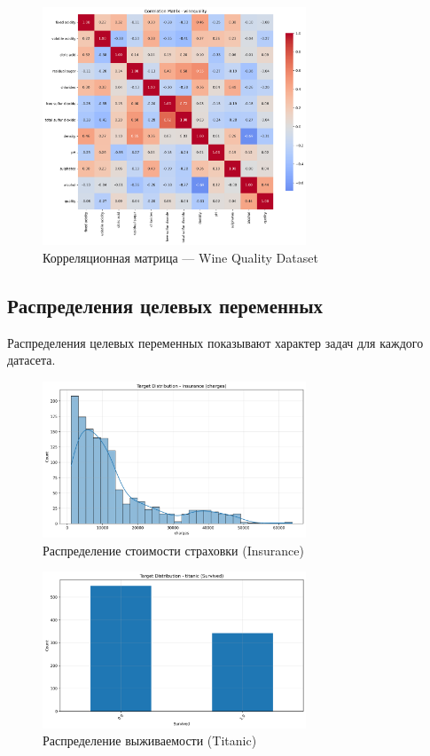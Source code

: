 \documentclass[a4paper]{article}
\begin{document}
\begin{figure}[H]
\centering
\includegraphics[width=0.7\textwidth]{images/correlation_heatmap_winequality.png}
\caption{Корреляционная матрица — Wine Quality Dataset}
\end{figure}

\subsection{Распределения целевых переменных}

Распределения целевых переменных показывают характер задач для каждого датасета.

\begin{figure}[H]
\centering
\includegraphics[width=0.7\textwidth]{images/target_distribution_insurance.png}
\caption{Распределение стоимости страховки (Insurance)}
\end{figure}

\begin{figure}[H]
\centering
\includegraphics[width=0.7\textwidth]{images/target_distribution_titanic.png}
\caption{Распределение выживаемости (Titanic)}
\end{figure}
\end{document}
